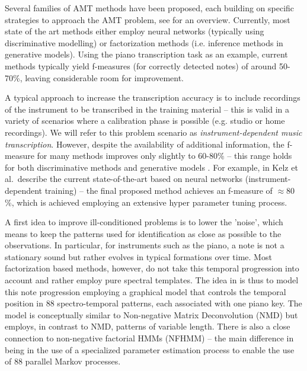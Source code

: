 \documentclass{article}
\begin{document}
Several families of AMT methods have been proposed, each building on specific strategies to approach the AMT problem, see \cite{KlapuriD06_SPforMusic_BOOK,BenetosDGKK12_AMTGlassCeiling_ISMIR,EwertS16_PianoTranscriptionADMM_TASLP} for an overview.
Currently, most state of the art methods either employ neural networks \cite{KelzDKBA2016_SimpleFramewisePianoTrans_ISMIR,SigtiaBD2016_NNPianoTrans_TASLP} (typically using discriminative modelling) or factorization methods \cite{BenetosEW14_PitchUnpitchedTranscription_ICASSP} (i.e. inference methods in generative models).
Using the piano transcription task as an example, current methods typically yield f-measures (for correctly detected notes) of around 50-70\%, leaving considerable room for improvement. 

A typical approach to increase the transcription accuracy is to include recordings of the instrument to be transcribed in the training material -- this is valid in a variety of scenarios where a calibration phase is possible (e.g. studio or home recordings). We will refer to this problem scenario as \emph{instrument-dependent music transcription}.
However, despite the availability of additional information, the f-measure for many methods improves only slightly to 60-80\% -- this range holds for both discriminative methods \cite{KelzDKBA2016_SimpleFramewisePianoTrans_ISMIR,SigtiaBD2016_NNPianoTrans_TASLP} and generative models \cite{OHanlonNKP2016_NonNegativeGroupSparseTranscription_TASLP,CogliatiDW2017_PianoTransConvolutional_IEEESPL}.
For example, in \cite{KelzDKBA2016_SimpleFramewisePianoTrans_ISMIR} Kelz et al.\ describe the current state-of-the-art based on neural networks (instrument-dependent training) -- the final proposed method achieves an f-measure of $\approx$$80$\%, which is achieved employing an extensive hyper parameter tuning process.

A first idea to improve ill-conditioned problems is to lower the 'noise', which means to keep the patterns used for identification as close as possible to the observations.
In particular, for instruments such as the piano, a note is not a stationary sound but rather evolves in typical formations over time.
Most factorization based methods, however, do not take this temporal progression into account and rather employ pure spectral templates.
The idea in \cite{EwertPS15_DPNMD_ICASSP} is thus to model this note progression employing a graphical model that controls the temporal position in 88 spectro-temporal patterns, each associated with one piano key.
The model is conceptually similar to Non-negative Matrix Deconvolution (NMD) \cite{Smaragdis04_NMD} but employs, in contrast to NMD, patterns of variable length.
There is also a close connection to non-negative factorial HMMs (NFHMM) \cite{MysoreS12_VariationalNFHMM_ICML,BenetosCW13_EfficientSIModel_IWMLM} %
-- the main difference in \cite{EwertPS15_DPNMD_ICASSP} being in the use of a specialized parameter estimation process to enable the use of 88 parallel Markov processes.
\end{document}
